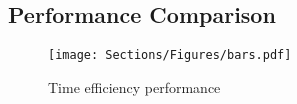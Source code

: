     \subsection{Performance Comparison}


        
        \begin{figure}[t]
            \centering
            \setlength{\abovecaptionskip}{-5pt}   %
            \setlength{\belowcaptionskip}{0pt}   %
            \texttt{[image: Sections/Figures/bars.pdf]}
            \caption{Time efficiency performance}
        \label{fig:time_eff}
        \end{figure}
        
